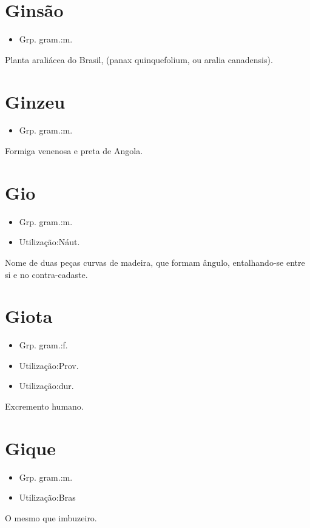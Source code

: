\section{Ginsão}
\begin{itemize}
\item {Grp. gram.:m.}
\end{itemize}
Planta araliácea do Brasil, (\textunderscore panax quinquefolium\textunderscore , ou \textunderscore aralia canadensis\textunderscore ).
\section{Ginzeu}
\begin{itemize}
\item {Grp. gram.:m.}
\end{itemize}
Formiga venenosa e preta de Angola.
\section{Gio}
\begin{itemize}
\item {Grp. gram.:m.}
\end{itemize}
\begin{itemize}
\item {Utilização:Náut.}
\end{itemize}
Nome de duas peças curvas de madeira, que formam ângulo, entalhando-se entre si e no contra-cadaste.
\section{Giota}
\begin{itemize}
\item {Grp. gram.:f.}
\end{itemize}
\begin{itemize}
\item {Utilização:Prov.}
\end{itemize}
\begin{itemize}
\item {Utilização:dur.}
\end{itemize}
Excremento humano.
\section{Gique}
\begin{itemize}
\item {Grp. gram.:m.}
\end{itemize}
\begin{itemize}
\item {Utilização:Bras}
\end{itemize}
O mesmo que \textunderscore imbuzeiro\textunderscore .
